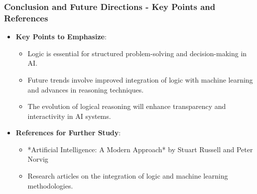 \documentclass[aspectratio=169]{beamer}
\begin{document}
\begin{frame}[fragile]
    \frametitle{Conclusion and Future Directions - Key Points and References}
    \begin{itemize}
        \item \textbf{Key Points to Emphasize}:
        \begin{itemize}
            \item Logic is essential for structured problem-solving and decision-making in AI.
            \item Future trends involve improved integration of logic with machine learning and advances in reasoning techniques.
            \item The evolution of logical reasoning will enhance transparency and interactivity in AI systems.
        \end{itemize}
        
        \item \textbf{References for Further Study}:
        \begin{itemize}
            \item *Artificial Intelligence: A Modern Approach* by Stuart Russell and Peter Norvig
            \item Research articles on the integration of logic and machine learning methodologies.
        \end{itemize}
    \end{itemize}
\end{frame}
\end{document}
